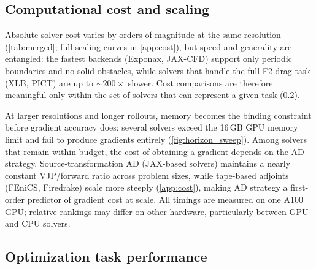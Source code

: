 \documentclass[11pt,a4paper]{article}
\begin{document}
\subsection{Computational cost and scaling}
\label{sec:scaling}

Absolute solver cost varies by orders of magnitude at the same
resolution (\cref{tab:merged}; full scaling curves in \cref{app:cost}),
but speed and generality are entangled: the fastest backends
(Exponax, JAX-CFD) support only periodic boundaries and no solid
obstacles, while solvers that handle the full F2 drag task (XLB, PICT)
are up to ${\sim}200\times$ slower. Cost comparisons are therefore meaningful only
within the set of solvers that can represent a given task (\cref{sec:optimization}).

At larger resolutions and longer rollouts, memory becomes the binding
constraint before gradient accuracy does: several solvers exceed the
16\,GB GPU memory limit and fail to produce gradients entirely
(\cref{fig:horizon_sweep}).
Among solvers that remain within budget, the cost of obtaining a
gradient depends on the AD strategy.
Source-transformation AD (JAX-based solvers) maintains a nearly constant
VJP/forward ratio across problem sizes, while tape-based adjoints
(FEniCS, Firedrake) scale more steeply (\cref{app:cost}), making AD
strategy a first-order predictor of gradient cost at scale.
All timings are measured on one A100 GPU;
relative rankings may differ on other hardware, particularly between
GPU and CPU solvers.

\subsection{Optimization task performance}
\label{sec:optimization}
\end{document}
